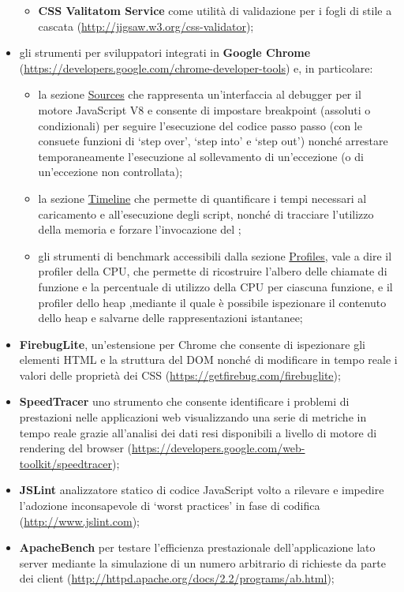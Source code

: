 \begin{itemize}
\begin{itemize}
   \item \textbf{CSS Valitatom Service} come utilità di validazione per i fogli di stile a cascata (\url{http://jigsaw.w3.org/css-validator});
 \end{itemize}
 \item gli strumenti per sviluppatori integrati in \textbf{Google Chrome} (\url{https://developers.google.com/chrome-developer-tools}) e, in particolare:
   \begin{itemize}
   \item la sezione \underline{Sources} che rappresenta un'interfaccia al debugger per il motore JavaScript V8 e consente di impostare breakpoint (assoluti o condizionali) per seguire l'esecuzione del codice passo passo (con le consuete funzioni di `step over', `step into' e `step out') nonché arrestare temporaneamente l'esecuzione al sollevamento di un'eccezione (o di un'eccezione non controllata);
   \item la sezione \underline{Timeline} che permette di quantificare i tempi necessari al caricamento e all'esecuzione degli script, nonché di tracciare l'utilizzo della memoria e forzare l'invocazione del ;
   \item  gli strumenti di benchmark accessibili dalla sezione \underline{Profiles}, vale a dire il profiler della CPU, che permette di ricostruire l'albero delle chiamate di funzione e la percentuale di utilizzo della CPU per ciascuna funzione, e il profiler dello heap ,mediante il quale è possibile ispezionare il contenuto dello heap e salvarne delle rappresentazioni istantanee;
   \end{itemize}
  \item \textbf{FirebugLite}, un'estensione per Chrome che consente di ispezionare gli elementi HTML e la struttura del DOM nonché di modificare in tempo reale i valori delle proprietà dei CSS (\url{https://getfirebug.com/firebuglite});
  \item \textbf{SpeedTracer} uno strumento che consente identificare i problemi di prestazioni nelle applicazioni web visualizzando una serie di metriche in tempo reale grazie all'analisi dei dati resi disponibili a livello di motore di rendering del browser (\url{https://developers.google.com/web-toolkit/speedtracer});
  \item \textbf{JSLint} analizzatore statico di codice JavaScript volto a rilevare e impedire l'adozione inconsapevole di `worst practices' in fase di codifica (\url{http://www.jslint.com});
  \item \textbf{ApacheBench} per testare l'efficienza prestazionale dell'applicazione lato server mediante la simulazione di un numero arbitrario di richieste da parte dei client (\url{http://httpd.apache.org/docs/2.2/programs/ab.html});

\end{itemize}
